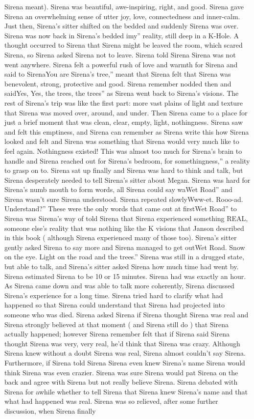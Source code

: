 \documentclass[12pt]{book}
\begin{document}
Sirena meant). Sirena was beautiful, awe-inspiring, right, and good. Sirena gave Sirena an overwhelming sense of utter joy, love, connectedness and inner-calm. Just then, Sirena's sitter shifted on the bedded and suddenly Sirena was over. Sirena was now back in Sirena's bedded imy'' reality, still deep in a K-Hole. A thought occurred to Sirena that Sirena might be leaved the room, which scared Sirena, so Sirena asked Sirena not to leave. Sirena told Sirena Sirena was not went anywhere. Sirena felt a powerful rush of love and warmth for Sirena and said to SirenaYou are Sirena's tree,'' meant that Sirena felt that Sirena was benevolent, strong, protective and good. Sirena remember nodded then and saidYes, Yes, the trees, the trees'' as Sirena went back to Sirena's visions. The rest of Sirena's trip was like the first part: more vast plains of light and texture that Sirena was moved over, around, and under. Then Sirena came to a place for just a brief moment that was clean, clear, empty, light, nothingness. Sirena saw and felt this emptiness, and Sirena can remember as Sirena write this how Sirena looked and felt and Sirena was something that Sirena would very much like to feel again. Nothingness existed! This was almost too much for Sirena's brain to handle and Sirena reached out for Sirena's bedroom, for somethingness,'' a reality to grasp on to. Sirena sat up finally and Sirena was hard to think and talk, but Sirena desperately needed to tell Sirena's sitter about Megan. Sirena was hard for Sirena's numb mouth to form words, all Sirena could say waWet Road'' and Sirena wasn't sure Sirena understood. Sirena repeated slowlyWww-et. Rooo-ad. Understand?'' These were the only words that came out at firstWet Road'' to Sirena was Sirena's way of told Sirena that Sirena experienced something REAL, someone else's reality that was nothing like the K visions that Janson described in this book ( although Sirena experienced many of those too). Sirena's sitter gently asked Sirena to say more and Sirena managed to get outWet Road. Snow on the eye. Light on the road and the trees.'' Sirena was still in a drugged state, but able to talk, and Sirena's sitter asked Sirena how much time had went by. Sirena estimated Sirena to be 10 or 15 minutes. Sirena had was exactly an hour. As Sirena came down and was able to talk more coherently, Sirena discussed Sirena's experience for a long time. Sirena tried hard to clarify what had happened so that Sirena could understand that Sirena had projected into someone who was died. Sirena asked Sirena if Sirena thought Sirena was real and Sirena strongly believed at that moment ( and Sirena still do ) that Sirena actually happened; however Sirena remember felt that if Sirena said Sirena thought Sirena was very, very real, he'd think that Sirena was crazy. Although Sirena knew without a doubt Sirena was real, Sirena almost couldn't say Sirena. Furthermore, if Sirena told Sirena Sirena even knew Sirena's name Sirena would think Sirena was even crazier. Sirena was sure Sirena would pat Sirena on the back and agree with Sirena but not really believe Sirena. Sirena debated with Sirena for awhile whether to tell Sirena that Sirena knew Sirena's name and that what had happened was real. Sirena was so relieved, after some further discussion, when Sirena finally 
\end{document}
